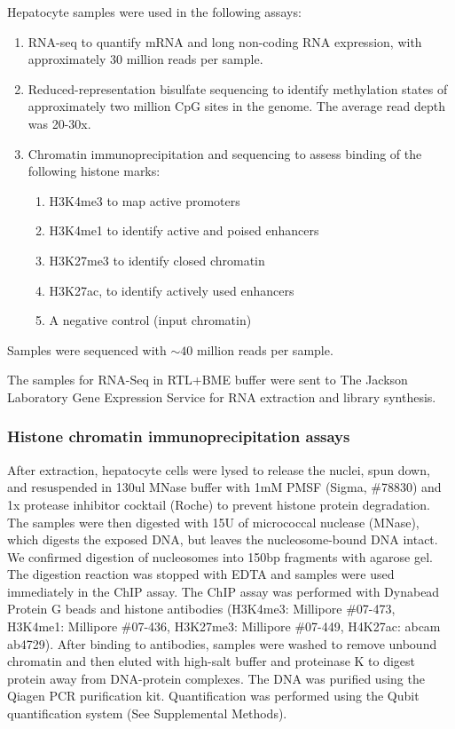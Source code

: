 \documentclass[
  11pt,
]{article}
\providecommand{\tightlist}{%
  \setlength{\itemsep}{0pt}\setlength{\parskip}{0pt}}
\begin{document}
Hepatocyte samples were used in the following assays:

\begin{enumerate}
\def\labelenumi{\arabic{enumi}.}
\tightlist
\item
  RNA-seq to quantify mRNA and long non-coding RNA expression, with
  approximately 30 million reads per sample.
\item
  Reduced-representation bisulfate sequencing to identify methylation
  states of approximately two million CpG sites in the genome. The
  average read depth was 20-30x.
\item
  Chromatin immunoprecipitation and sequencing to assess binding of the
  following histone marks:

  \begin{enumerate}
  \def\labelenumii{\alph{enumii}.}
  \tightlist
  \item
    H3K4me3 to map active promoters
  \item
    H3K4me1 to identify active and poised enhancers
  \item
    H3K27me3 to identify closed chromatin
  \item
    H3K27ac, to identify actively used enhancers
  \item
    A negative control (input chromatin)
  \end{enumerate}
\end{enumerate}

Samples were sequenced with \(\sim40\) million reads per sample.

The samples for RNA-Seq in RTL+BME buffer were sent to The Jackson
Laboratory Gene Expression Service for RNA extraction and library
synthesis.

\hypertarget{histone-chromatin-immunoprecipitation-assays}{%
\subsubsection{Histone chromatin immunoprecipitation
assays}\label{histone-chromatin-immunoprecipitation-assays}}

After extraction, hepatocyte cells were lysed to release the nuclei,
spun down, and resuspended in 130ul MNase buffer with 1mM PMSF (Sigma,
\#78830) and 1x protease inhibitor cocktail (Roche) to prevent histone
protein degradation. The samples were then digested with 15U of
micrococcal nuclease (MNase), which digests the exposed DNA, but leaves
the nucleosome-bound DNA intact. We confirmed digestion of nucleosomes
into 150bp fragments with agarose gel. The digestion reaction was
stopped with EDTA and samples were used immediately in the ChIP assay.
The ChIP assay was performed with Dynabead Protein G beads and histone
antibodies (H3K4me3: Millipore \#07-473, H3K4me1: Millipore \#07-436,
H3K27me3: Millipore \#07-449, H4K27ac: abcam ab4729). After binding to
antibodies, samples were washed to remove unbound chromatin and then
eluted with high-salt buffer and proteinase K to digest protein away
from DNA-protein complexes. The DNA was purified using the Qiagen PCR
purification kit. Quantification was performed using the Qubit
quantification system (See Supplemental Methods).
\end{document}
